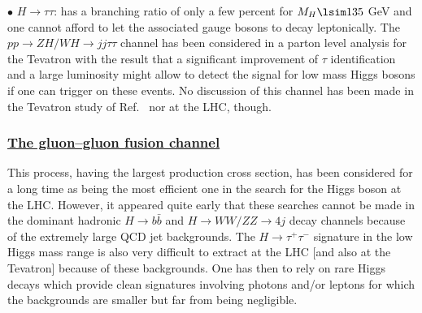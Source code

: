 $\bullet$ \underline{$H \to \tau \tau$}: has a branching ratio of only a few 
percent for $M_H \lsim 135$ GeV and one cannot afford to let the associated 
gauge bosons to decay leptonically. The $pp \to ZH/WH \to jj \tau \tau$ channel
has been considered in a parton level analysis \cite{pp-HW-Mrenna} for the
Tevatron with the result that a significant improvement of $\tau$ identification
and a large luminosity might allow to detect the signal for low mass Higgs 
bosons if one can trigger on these events. No discussion of this channel has
been made in the Tevatron study of Ref.~\cite{Higgs-TeV} nor at the
LHC, though.   

\vspace*{-3mm}
\subsubsection*{\underline{The gluon--gluon fusion channel}}

This process, having the largest production cross section, has been considered
for a long time as being the most efficient one in the search for the Higgs
boson at the LHC. However, it appeared quite early that these searches cannot
be made in the dominant hadronic $H \to b\bar{b}$ and $H \to WW/ZZ \to 4j$ decay
channels because of the extremely large QCD jet backgrounds. The $H \to \tau^+
\tau^-$ signature in the low Higgs mass range is also very difficult to extract
at the LHC [and also at the Tevatron] because of these backgrounds. One has
then to rely on rare Higgs decays which provide clean signatures involving 
photons and/or leptons for which the backgrounds are smaller but far from being 
negligible.\s

